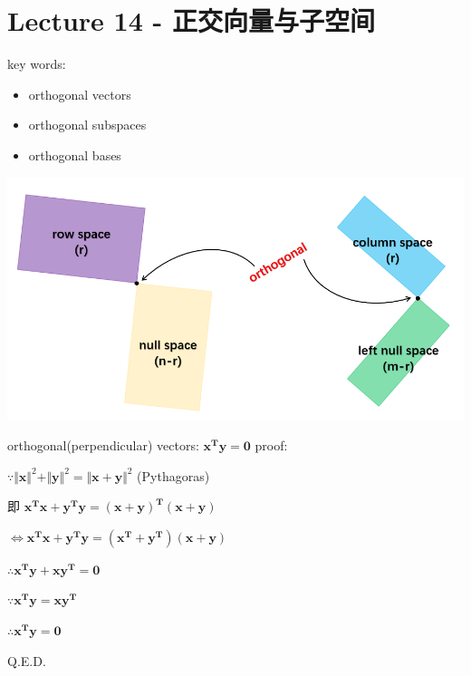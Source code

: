 \documentclass[12pt, a4paper]{article}
\begin{document}
{\newpage
\section{Lecture 14 - 正交向量与子空间}
\pagestyle{fancy}
\lhead{}
\rhead{}

\noindent key words:
\begin{itemize}
	\item orthogonal vectors
	\item orthogonal subspaces
	\item orthogonal bases
\end{itemize}
\begin{center}
	\includegraphics[scale=0.75]{figures/S14-1.png}
\end{center}
\vspace{14pt}
orthogonal(perpendicular) vectors: ${\mathbf{x^{T}}}{\mathbf{y}} = {\mathbf{0}}$
\newline
proof:
\par $\because \Vert{\mathbf{x}}\Vert^2 + \Vert{\mathbf{y}}\Vert^2 = \Vert{\mathbf{x+y}}\Vert^2$ \quad (Pythagoras)
\par 即 ${\mathbf{x^{T}}}{\mathbf{x}} + {\mathbf{y^{T}}}{\mathbf{y}} = {\mathbf{(x+y)^{T}}}{\mathbf{(x+y)}}$
\par $\Leftrightarrow {\mathbf{x^{T}}}{\mathbf{x}} + {\mathbf{y^{T}}}{\mathbf{y}} = {\mathbf{(x^T+y^T)}}{\mathbf{(x+y)}}$
\par $\therefore {\mathbf{x^{T}}}{\mathbf{y}} + {\mathbf{x}}{\mathbf{y^{T}}} = {\mathbf{0}}$
\par $\because {\mathbf{x^{T}}}{\mathbf{y}} = {\mathbf{x}}{\mathbf{y^{T}}}$
\par $\therefore {\mathbf{x^{T}}}{\mathbf{y}} = {\mathbf{0}}$
\par Q.E.D.
\vspace{14pt}
}
\end{document}
